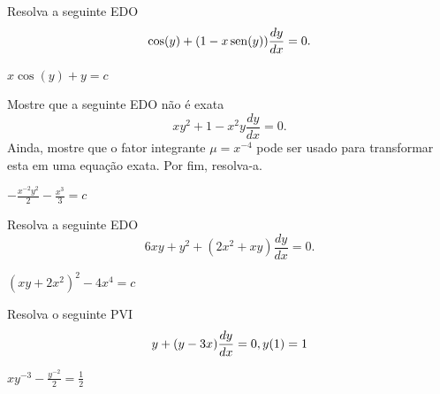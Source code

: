 \begin{exer}
  Resolva a seguinte EDO
  \begin{equation}
    \cos(y) + (1-x\operatorname{sen}(y))\frac{dy}{dx} = 0.
  \end{equation}
\end{exer}
\begin{resp}
  $x\cos(y) + y = c$
\end{resp}

\begin{exer}
  Mostre que a seguinte EDO não é exata
  \begin{equation}
    xy^2+1 - x^2y\frac{dy}{dx} = 0.
  \end{equation}
  Ainda, mostre que o fator integrante $\mu = x^{-4}$ pode ser usado para transformar esta em uma equação exata. Por fim, resolva-a.
\end{exer}
\begin{resp}
  $-\frac{x^{-2}y^2}{2}-\frac{x^3}{3} = c$
\end{resp}

\begin{exer}
  Resolva a seguinte EDO
  \begin{equation}
    6xy+y^2 + (2x^2+xy)\frac{dy}{dx} = 0.
  \end{equation}
\end{exer}
\begin{resp}
  $(xy+2x^2)^2-4x^4=c$
\end{resp}

\begin{exer}
  Resolva o seguinte PVI
  \begin{equation}
    y + (y-3x)\frac{dy}{dx} = 0,\\
    y(1)=1
  \end{equation}
\end{exer}
\begin{resp}
  $xy^{-3}-\frac{y^{-2}}{2} = \frac{1}{2}$
\end{resp}